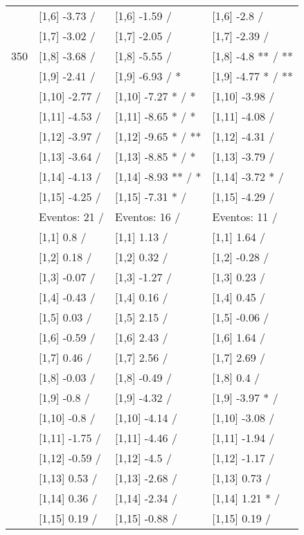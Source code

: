 \begin{table}
\begin{tabular}[t]{llll}
 & {}[1,6] -3.73  / & {}[1,6] -1.59  / & {}[1,6] -2.8  /\\
 & {}[1,7] -3.02  / & {}[1,7] -2.05  / & {}[1,7] -2.39  /\\
350 & {}[1,8] -3.68  / & {}[1,8] -5.55  / & {}[1,8] -4.8 ** / **\\
\addlinespace
 & {}[1,9] -2.41  / & {}[1,9] -6.93  / * & {}[1,9] -4.77 * / **\\
 & {}[1,10] -2.77  / & {}[1,10] -7.27 * / * & {}[1,10] -3.98  /\\
 & {}[1,11] -4.53  / & {}[1,11] -8.65 * / * & {}[1,11] -4.08  /\\
 & {}[1,12] -3.97  / & {}[1,12] -9.65 * / ** & {}[1,12] -4.31  /\\
 & {}[1,13] -3.64  / & {}[1,13] -8.85 * / * & {}[1,13] -3.79  /\\
\addlinespace
 & {}[1,14] -4.13  / & {}[1,14] -8.93 ** / * & {}[1,14] -3.72 * /\\
 & {}[1,15] -4.25  / & {}[1,15] -7.31 * / & {}[1,15] -4.29  /\\
 & Eventos:  21 / & Eventos:  16 / & Eventos:  11 /\\
 & {}[1,1] 0.8  / & {}[1,1] 1.13  / & {}[1,1] 1.64  /\\
 & {}[1,2] 0.18  / & {}[1,2] 0.32  / & {}[1,2] -0.28  /\\
\addlinespace
 & {}[1,3] -0.07  / & {}[1,3] -1.27  / & {}[1,3] 0.23  /\\
 & {}[1,4] -0.43  / & {}[1,4] 0.16  / & {}[1,4] 0.45  /\\
 & {}[1,5] 0.03  / & {}[1,5] 2.15  / & {}[1,5] -0.06  /\\
 & {}[1,6] -0.59  / & {}[1,6] 2.43  / & {}[1,6] 1.64  /\\
 & {}[1,7] 0.46  / & {}[1,7] 2.56  / & {}[1,7] 2.69  /\\
\addlinespace
500 & {}[1,8] -0.03  / & {}[1,8] -0.49  / & {}[1,8] 0.4  /\\
 & {}[1,9] -0.8  / & {}[1,9] -4.32  / & {}[1,9] -3.97 * /\\
 & {}[1,10] -0.8  / & {}[1,10] -4.14  / & {}[1,10] -3.08  /\\
 & {}[1,11] -1.75  / & {}[1,11] -4.46  / & {}[1,11] -1.94  /\\
 & {}[1,12] -0.59  / & {}[1,12] -4.5  / & {}[1,12] -1.17  /\\
\addlinespace
 & {}[1,13] 0.53  / & {}[1,13] -2.68  / & {}[1,13] 0.73  /\\
 & {}[1,14] 0.36  / & {}[1,14] -2.34  / & {}[1,14] 1.21 * /\\
 & {}[1,15] 0.19  / & {}[1,15] -0.88  / & {}[1,15] 0.19  /\\
\bottomrule
\end{tabular}
\end{table}
